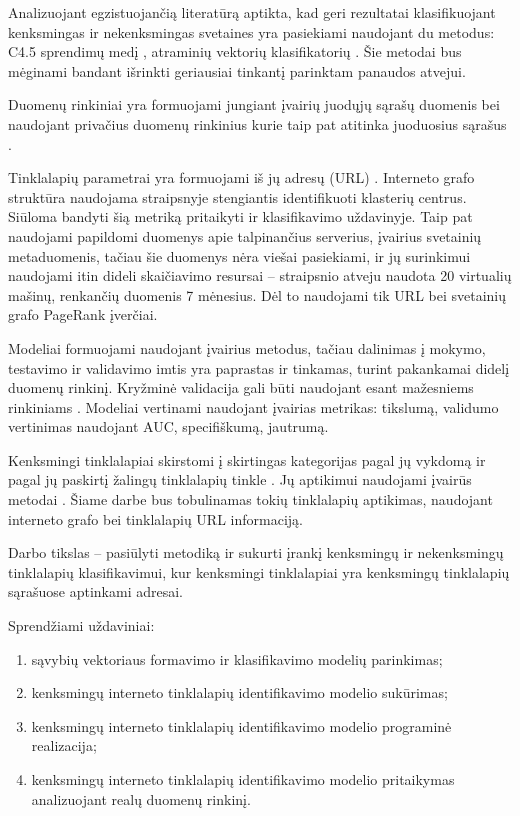 Analizuojant egzistuojančią literatūrą aptikta, kad geri rezultatai klasifikuojant kenksmingas ir nekenksmingas svetaines yra pasiekiami naudojant du metodus: C4.5 sprendimų medį \cite{trees}, atraminių vektorių klasifikatorių \cite{comp}. Šie metodai bus mėginami bandant išrinkti geriausiai tinkantį parinktam panaudos atvejui.

Duomenų rinkiniai yra formuojami jungiant įvairių juodųjų sąrašų duomenis bei naudojant privačius duomenų rinkinius kurie taip pat atitinka juoduosius sąrašus \cite{trees, comp, webcop}.

Tinklalapių parametrai yra formuojami iš jų adresų (URL) \cite{trees, comp}. Interneto grafo struktūra naudojama straipsnyje \cite{linchpins} stengiantis identifikuoti klasterių centrus. Siūloma bandyti šią metriką pritaikyti ir klasifikavimo uždavinyje. Taip pat naudojami papildomi duomenys apie talpinančius serverius, įvairius svetainių metaduomenis, tačiau šie duomenys nėra viešai pasiekiami, ir jų surinkimui naudojami itin dideli skaičiavimo resursai -- \cite{linchpins} straipsnio atveju naudota 20 virtualių mašinų, renkančių duomenis 7 mėnesius. Dėl to naudojami tik URL bei svetainių grafo PageRank įverčiai.

Modeliai formuojami naudojant įvairius metodus, tačiau dalinimas į mokymo, testavimo ir validavimo imtis yra paprastas ir tinkamas, turint pakankamai didelį duomenų rinkinį. Kryžminė validacija gali būti naudojant esant mažesniems rinkiniams \cite{trees}. Modeliai vertinami naudojant įvairias metrikas: tikslumą, validumo vertinimas naudojant AUC, specifiškumą, jautrumą.

\newpage
{}
Kenksmingi tinklalapiai skirstomi į skirtingas kategorijas pagal jų vykdomą \cite{tax} ir pagal jų paskirtį žalingų tinklalapių tinkle \cite{linchpins}. Jų aptikimui naudojami įvairūs metodai \cite{comp}. Šiame darbe bus tobulinamas tokių tinklalapių aptikimas, naudojant interneto grafo bei tinklalapių URL informaciją.

Darbo tikslas -- pasiūlyti metodiką ir sukurti įrankį kenksmingų ir nekenksmingų tinklalapių klasifikavimui, kur kenksmingi tinklalapiai yra kenksmingų tinklalapių sąrašuose aptinkami adresai.

Sprendžiami uždaviniai:
\begin{enumerate}
    \item sąvybių vektoriaus formavimo ir klasifikavimo modelių parinkimas;
    \item kenksmingų interneto tinklalapių identifikavimo modelio sukūrimas;
    \item kenksmingų interneto tinklalapių identifikavimo modelio programinė realizacija;
    \item kenksmingų interneto tinklalapių identifikavimo modelio pritaikymas analizuojant realų duomenų rinkinį.
\end{enumerate}
